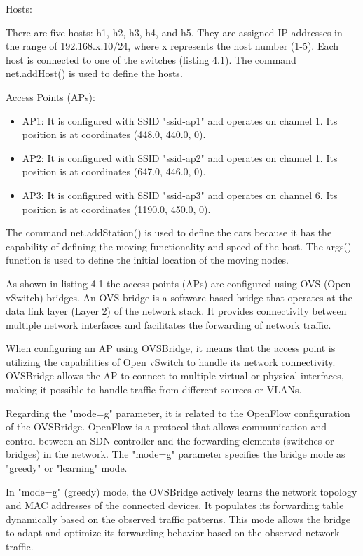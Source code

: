 \documentclass[
  oneside,
  11pt, a4paper,
  footinclude=true,
  headinclude=true,
  cleardoublepage=empty
]{scrbook}
\begin{document}
Hosts:

There are five hosts: h1, h2, h3, h4, and h5. They are assigned IP addresses in the range of 192.168.x.10/24, where x represents the host number (1-5). Each host is connected to one of the switches (listing 4.1). The command net.addHost() is used to define the hosts.

Access Points (APs):
\begin{itemize}
    \item AP1: It is configured with SSID "ssid-ap1" and operates on channel 1. Its position is at coordinates (448.0, 440.0, 0).
    \item AP2: It is configured with SSID "ssid-ap2" and operates on channel 1. Its position is at coordinates (647.0, 446.0, 0).
    \item AP3: It is configured with SSID "ssid-ap3" and operates on channel 6. Its position is at coordinates (1190.0, 450.0, 0). 
\end{itemize}
The command net.addStation() is used to define the cars because it has the capability of defining the moving
functionality and speed of the host. The args() function is used to define the initial location of the
moving nodes.
\par
As shown in listing 4.1 the access points (APs) are configured using OVS (Open vSwitch) bridges. An OVS bridge is a software-based bridge that operates at the data link layer (Layer 2) of the network stack. It provides connectivity between multiple network interfaces and facilitates the forwarding of network traffic.

When configuring an AP using OVSBridge, it means that the access point is utilizing the capabilities of Open vSwitch to handle its network connectivity. OVSBridge allows the AP to connect to multiple virtual or physical interfaces, making it possible to handle traffic from different sources or VLANs.

Regarding the "mode=g" parameter, it is related to the OpenFlow configuration of the OVSBridge. OpenFlow is a protocol that allows communication and control between an SDN controller and the forwarding elements (switches or bridges) in the network. The "mode=g" parameter specifies the bridge mode as "greedy" or "learning" mode.

In "mode=g" (greedy) mode, the OVSBridge actively learns the network topology and MAC addresses of the connected devices. It populates its forwarding table dynamically based on the observed traffic patterns. This mode allows the bridge to adapt and optimize its forwarding behavior based on the observed network traffic.
\end{document}
